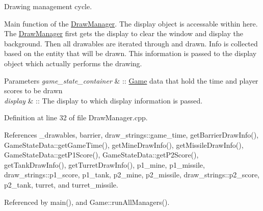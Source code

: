Drawing management cycle. 

Main function of the \hyperlink{classDrawManager}{Draw\-Manager}. The display object is accessable within here. The \hyperlink{classDrawManager}{Draw\-Manager} first gets the display to clear the window and display the background. Then all drawables are iterated through and drawn. Info is collected based on the entity that will be drawn. This information is passed to the display object which actually performs the drawing. 
\begin{DoxyParams}{Parameters}
{\em game\-\_\-state\-\_\-container} & \-:\-: \hyperlink{classGame}{Game} data that hold the time and player scores to be drawn \\
\hline
{\em display} & \-:\-: The display to which display information is passed. \\
\hline
\end{DoxyParams}


Definition at line 32 of file Draw\-Manager.\-cpp.



References \-\_\-drawables, barrier, draw\-\_\-strings\-::game\-\_\-time, get\-Barrier\-Draw\-Info(), Game\-State\-Data\-::get\-Game\-Time(), get\-Mine\-Draw\-Info(), get\-Missile\-Draw\-Info(), Game\-State\-Data\-::get\-P1\-Score(), Game\-State\-Data\-::get\-P2\-Score(), get\-Tank\-Draw\-Info(), get\-Turret\-Draw\-Info(), p1\-\_\-mine, p1\-\_\-missile, draw\-\_\-strings\-::p1\-\_\-score, p1\-\_\-tank, p2\-\_\-mine, p2\-\_\-missile, draw\-\_\-strings\-::p2\-\_\-score, p2\-\_\-tank, turret, and turret\-\_\-missile.



Referenced by main(), and Game\-::run\-All\-Managers().



